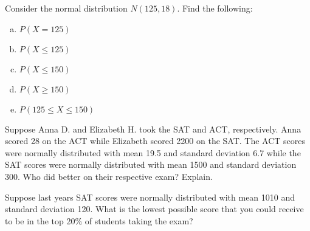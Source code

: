 \documentclass[11pt,letterpaper]{article}
\begin{document}

 Consider the normal distribution $N(125, 18)$. Find the following:
	\begin{enumerate}[(a)]
	\item $P(X= 125)$
	\item $P(X \leq 125)$
	\item $P(X \leq 150)$
	\item $P(X \geq 150)$
	\item $P(125 \leq X \leq 150)$
	\end{enumerate}



\newpage



 Suppose Anna D. and Elizabeth H. took the SAT and ACT, respectively. Anna scored 28 on the ACT while Elizabeth scored 2200 on the SAT. The ACT scores were normally distributed with mean 19.5 and standard deviation 6.7 while the SAT scores were normally distributed with mean 1500 and standard deviation 300. Who did better on their respective exam? Explain. 



\newpage



 Suppose last years SAT scores were normally distributed with mean 1010 and standard deviation 120. What is the lowest possible score that you could receive to be in the top 20\% of students taking the exam?
\end{document}
